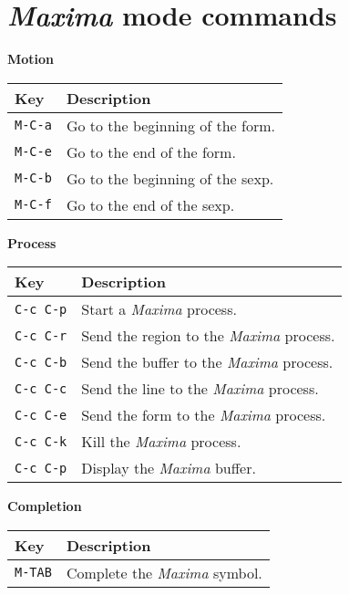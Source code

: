 \documentclass{article}
\newcommand{\mx}{\textsl{\sffamily Maxima}}
\begin{document}
\section{\mx{} mode commands}
\label{app:mxmode}

\smallskip

\noindent
\textbf{Motion}

\smallskip

\noindent
\begin{tabular}{p{\firstcol}p{\secondcol}}
\hline
\textbf{Key} & \textbf{Description}\\
\hline
\texttt{M-C-a} & Go to the beginning of the form.\\
\texttt{M-C-e} & Go to the end of the form.\\
\texttt{M-C-b} & Go to the beginning of the sexp.\\
\texttt{M-C-f} & Go to the end of the sexp.
\end{tabular}

\smallskip

\noindent
\textbf{Process}

\smallskip

\noindent
\begin{tabular}{p{\firstcol}p{\secondcol}}
\hline
\textbf{Key} & \textbf{Description}\\
\hline
\texttt{C-c C-p} & Start a \mx{} process.\\
\texttt{C-c C-r} & Send the region to the \mx{} process.\\
\texttt{C-c C-b} & Send the buffer to the \mx{} process.\\
\texttt{C-c C-c} & Send the line to the \mx{} process.\\
\texttt{C-c C-e} & Send the form to the \mx{} process.\\
\texttt{C-c C-k} & Kill the \mx{} process.\\
\texttt{C-c C-p} & Display the \mx{} buffer.
\end{tabular}

\smallskip

\noindent
\textbf{Completion}

\smallskip

\noindent
\begin{tabular}{p{\firstcol}p{\secondcol}}
\hline
\textbf{Key} & \textbf{Description}\\
\hline
\texttt{M-TAB} & Complete the \mx{} symbol.\\
\end{tabular}
\end{document}
